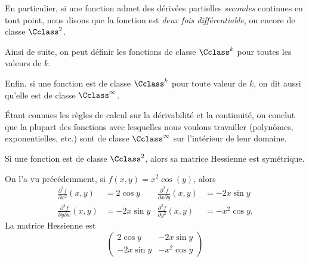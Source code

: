 \begin{frame}
  \begin{definition}
    En particulier, si une fonction admet des dérivées partielles \emph{secondes} continues en tout point\pause{}, nous disons que la fonction est \emph{deux fois différentiable},\pause{} ou encore de classe \(\Cclass^2\).\pause{}

    Ainsi de suite,\pause{} on peut définir les fonctions de classe \(\Cclass^{k}\) pour toutes les valeurs de \(k\).\pause{}

    Enfin, si une fonction est de classe \(\Cclass^{k}\) pour toute valeur de \(k\),\pause{} on dit aussi qu'elle est de classe \(\Cclass^{\infty}\).
  \end{definition}\pause{}

  \begin{remark*}\pause{}
    Étant connues les règles de calcul sur la dérivabilité et la continuité,\pause{} on conclut que la plupart des fonctions avec lesquelles nous voulons travailler (polynômes, exponentielles, etc.)\pause{} sont de classe \(\Cclass^{\infty}\) sur l'intérieur de leur domaine.
  \end{remark*}
\end{frame}

\begin{frame}
  \begin{proposition}\pause{}
    Si une fonction est de classe \(\Cclass^{2}\),\pause{} alors sa matrice Hessienne est symétrique.
  \end{proposition}\pause{}

  \begin{example}
    On l'a vu précédemment, si \(f(x,y) = x^{2}\cos(y)\), alors\pause{}
    \begin{align*}
      \frac{\partial^{2} f}{\partial x^{2}}(x,y)
      &= 2 \cos y & \frac{\partial^{2} f}{\partial x\partial y}(x,y) &= -2x \sin y\\
      \frac{\partial^{2} f}{\partial y\partial x}(x,y)
      &= -2 x \sin y & \frac{\partial^{2} f}{\partial y^{2}}(x,y) &= -x^{2} \cos y.
    \end{align*}\pause{}
    La matrice Hessienne est
    \begin{equation*}
      \begin{pmatrix}
      2 \cos y & - 2x\sin y\\
      -2x\sin y & -x^{2}\cos y
    \end{pmatrix}
    \end{equation*}
  \end{example}
\end{frame}
